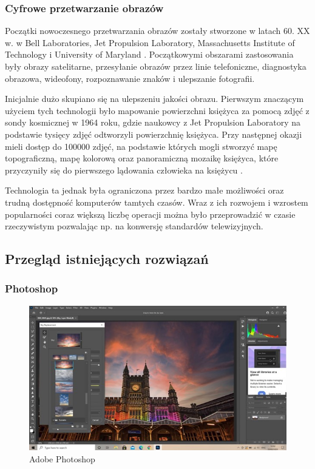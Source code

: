 \subsubsection{Cyfrowe przetwarzanie obrazów}
Początki nowoczesnego przetwarzania obrazów zostały stworzone w latach 60. XX w. w Bell Laboratories, Jet Propulsion Laboratory, Massachusetts Institute of Technology i University of Maryland \cite{computerProcessing}. 
Początkowymi obszarami zastosowania były obrazy satelitarne, przesyłanie obrazów przez linie telefoniczne, diagnostyka obrazowa, wideofony, rozpoznawanie znaków i ulepszanie fotografii. 

Inicjalnie dużo skupiano się na ulepszeniu jakości obrazu. Pierwszym znaczącym użyciem tych technologii było mapowanie powierzchni księżyca za pomocą zdjęć z sondy kosmicznej w 1964 roku, gdzie naukowcy z Jet Propulsion Laboratory na podstawie tysięcy zdjęć odtworzyli powierzchnię księżyca. 
Przy następnej okazji mieli dostęp do 100000 zdjęć, na podstawie których mogli stworzyć mapę topograficzną, mapę kolorową oraz panoramiczną mozaikę księżyca, które przyczyniły się do pierwszego lądowania człowieka na księżycu \cite{digitalImageProcessing}.

Technologia ta jednak była ograniczona przez bardzo małe możliwości oraz trudną dostępność komputerów tamtych czasów. 
Wraz z ich rozwojem i wzrostem popularności coraz większą liczbę operacji można było przeprowadzić w czasie rzeczywistym pozwalając np. na konwersję standardów telewizyjnych. 
\subsection{Przegląd istniejących rozwiązań}
\subsubsection{Photoshop}
\begin{figure}[H]
    \centering
    \includegraphics{./images/Picture2.jpg}
    \caption{Adobe Photoshop}
    \label{fig:photoshop}
\end{figure}

